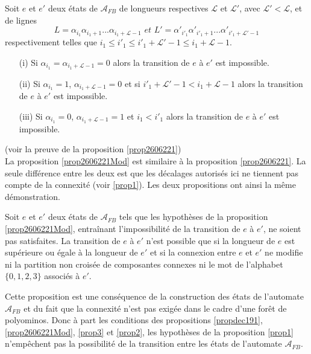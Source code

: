 \begin{Prop}\label{prop2606221Mod}
Soit $e$ et $e'$ deux états  de $\mathcal{A}_{FB}$ de longueurs respectives $\mathcal{L}$ et $\mathcal{L}'$, avec $\mathcal{L}'< \mathcal{L}$, et de lignes $$L=\alpha_{i_{1}}\alpha_{i_{1}+1}...\alpha_{i_{1}+\mathcal{L}-1} \textit{  et  }L'=\alpha'_{i'_{1}}\alpha'_{i'_{1}+1}...\alpha'_{i'_{1}+\mathcal{L}'-1}$$  respectivement telles que  $i_{1}\leq i'_{1}\leq i'_{1}+\mathcal{L}'-1 \leq i_{1}+\mathcal{L}-1 $.
 \begin{itemize}
 \item[(i)] Si $\alpha_{i_{1}}= \alpha_{i_{1}+\mathcal{L}-1}=0$ alors la transition de $e$ à $e'$ est impossible.
 \item[(ii)] Si $\alpha_{i_{1}}=1$, $\alpha_{i_{1}+\mathcal{L}-1}=0$ et si $i'_{1}+\mathcal{L}'-1 < i_{1}+\mathcal{L}-1 $ alors la transition de $e$ à $e'$ est impossible.
 \item[(iii)] Si $\alpha_{i_{1}}=0$, $\alpha_{i_{1}+\mathcal{L}-1}=1$ et  $i_{1} < i'_{1} $ alors la transition de $e$ à $e'$ est impossible.
 \end{itemize}
\end{Prop}
\begin{Pre} (voir la preuve de la proposition \ref{prop2606221})\mbox{ }\\
La proposition \ref{prop2606221Mod}  est similaire à la  proposition \ref{prop2606221}. La seule différence entre les deux est que les décalages autorisés ici ne tiennent pas compte de la connexité (voir \ref{prop1}). Les deux propositions ont ainsi la même démonstration.
\end{Pre}
\begin{Prop}\label{prop3chp3}
Soit $e$ et $e'$ deux états de $\mathcal{A}_{FB}$ tels que les hypothèses de la proposition \ref{prop2606221Mod},  entraînant l'impossibilité de la transition de $e$ à $e'$, ne soient pas satisfaites. La transition de $e$ à $e'$ n'est possible que si  la longueur de $e$ est supérieure ou égale à la longueur de $e'$ et si la connexion  entre $e$ et $e'$ ne modifie ni la partition non croisée de composantes connexes ni le mot de l'alphabet $\{0,1,2,3\}$ associés à $e'$.
\end{Prop}
\begin{Pre}
Cette proposition  est une conséquence de la construction  des états de l'automate $\mathcal{A}_{FB}$ et du fait que la connexité n'est pas exigée dans le cadre d'une forêt de polyominos. Donc à part les conditions des propositions \ref{propdec191}, \ref{prop2606221Mod}, \ref{prop3} et \ref{prop2}, les hypothèses de la proposition \ref{prop1} n'empêchent pas la possibilité de la transition entre les  états de l'automate $\mathcal{A}_{FB}$.
\end{Pre}
